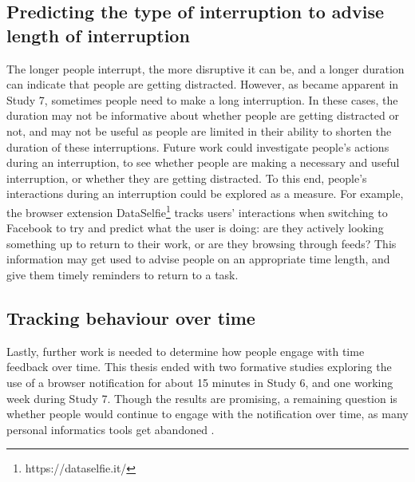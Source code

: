 \subsection{Predicting the type of interruption to advise length of interruption}
The longer people interrupt, the more disruptive it can be, and a longer duration can indicate that people are getting distracted. However, as became apparent in Study 7, sometimes people need to make a long interruption. In these cases, the duration may not be informative about whether people are getting distracted or not, and may not be useful as people are limited in their ability to shorten the duration of these interruptions. Future work could investigate people's actions during an interruption, to see whether people are making a necessary and useful interruption, or whether they are getting distracted. To this end, people's interactions during an interruption could be explored as a measure. For example, the browser extension DataSelfie\footnote{https://dataselfie.it/} tracks users' interactions when switching to Facebook to try and predict what the user is doing: are they actively looking something up to return to their work, or are they browsing through feeds? This information may get used to advise people on an appropriate time length, and give them timely reminders to return to a task. 



\subsection{Tracking behaviour over time}
Lastly, further work is needed to determine how people engage with time feedback over time. This thesis ended with two formative studies exploring the use of a browser notification for about 15 minutes in Study 6, and one working week during Study 7. Though the results are promising, a remaining question is whether people would continue to engage with the notification over time, as many personal informatics tools get abandoned \citep{Lazar2015}. 

